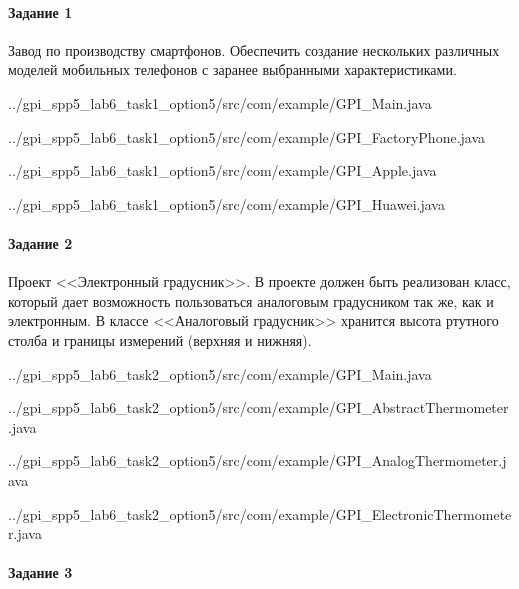 \paragraph{Задание 1} \hspace{0pt}

Завод по производству смартфонов.
Обеспечить создание нескольких различных моделей мобильных телефонов с заранее выбранными характеристиками.


{../gpi_spp5_lab6_task1_option5/src/com/example/GPI_Main.java}


{../gpi_spp5_lab6_task1_option5/src/com/example/GPI_FactoryPhone.java}


{../gpi_spp5_lab6_task1_option5/src/com/example/GPI_Apple.java}


{../gpi_spp5_lab6_task1_option5/src/com/example/GPI_Huawei.java}

\paragraph{Задание 2} \hspace{0pt}

Проект <<Электронный градусник>>. В проекте должен быть реализован класс,
который дает возможность пользоваться аналоговым градусником так же,
как и электронным. В классе <<Аналоговый градусник>> хранится высота ртутного столба
и границы измерений (верхняя и нижняя).


{../gpi_spp5_lab6_task2_option5/src/com/example/GPI_Main.java}


{../gpi_spp5_lab6_task2_option5/src/com/example/GPI_AbstractThermometer.java}


{../gpi_spp5_lab6_task2_option5/src/com/example/GPI_AnalogThermometer.java}


{../gpi_spp5_lab6_task2_option5/src/com/example/GPI_ElectronicThermometer.java}

\newpage

\paragraph{Задание 3} \hspace{0pt}


